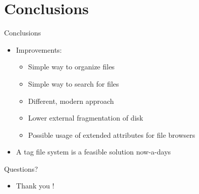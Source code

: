 \documentclass{beamer}
\begin{document}
\section{Conclusions}
\begin{frame}{Conclusions}
    \begin{itemize}
        \item {Improvements:}
	\begin{itemize}
		\item{Simple way to organize files}
		\item{Simple way to search for files}
		\item{Different, modern approach}
		\item{Lower external fragmentation of disk}
		\item{Possible usage of extended attributes for file browsers}
	\end{itemize}
        \item {A tag file system is a feasible solution now-a-days} 
    \end{itemize}
\end{frame}

\begin{frame}{Questions?}
    \begin{itemize}
	\item {Thank you !} 
    \end{itemize}
\end{frame}
\end{document}
